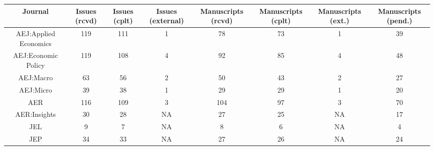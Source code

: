 
\begin{tabular}{@{\extracolsep{5pt}} cccccccc} 
\toprule 
Journal & Issues (rcvd) & Issues (cplt) & Issues (external) & Manuscripts (rcvd) & Manuscripts (cplt) & Manuscripts (ext.) & Manuscripts (pend.) \\ 
\midrule AEJ:Applied Economics & 119 & 111 & 1 & 78 & 73 & 1 & 39 \\ 
AEJ:Economic Policy & 119 & 108 & 4 & 92 & 85 & 4 & 48 \\ 
AEJ:Macro & 63 & 56 & 2 & 50 & 43 & 2 & 27 \\ 
AEJ:Micro & 39 & 38 & 1 & 29 & 29 & 1 & 20 \\ 
AER & 116 & 109 & 3 & 104 & 97 & 3 & 70 \\ 
AER:Insights & 30 & 28 & NA & 27 & 25 & NA & 17 \\ 
JEL & 9 & 7 & NA & 8 & 6 & NA & 4 \\ 
JEP & 34 & 33 & NA & 27 & 26 & NA & 24 \\ 
\bottomrule 
\end{tabular} 
